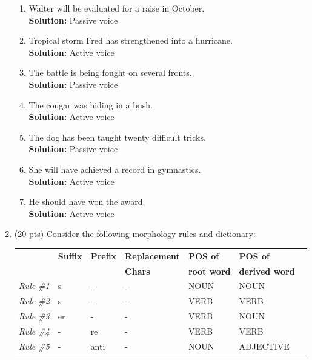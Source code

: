 \documentclass[11pt]{article}
\begin{document}
\begin{enumerate}
\begin{enumerate}
\item Walter will be evaluated for a raise in October.  \\
\textbf{Solution:} Passive voice\\

\item Tropical storm Fred has strengthened into a hurricane. \\
\textbf{Solution:} Active voice\\

\item The battle is being fought on several fronts.  \\
\textbf{Solution:} Passive voice\\

\item The cougar was hiding in a bush. \\
\textbf{Solution:} Active voice\\

\item The dog has been taught twenty difficult tricks.  \\
\textbf{Solution:} Passive voice\\

\item She will have achieved a record in gymnastics. \\
\textbf{Solution:} Active voice\\

\item He should have won the award.  \\
\textbf{Solution:} Active voice\\

\end{enumerate}


\newpage
\item (20 pts) Consider the following morphology rules and dictionary:

\begin{center}
\begin{tabular}{|l|l|l|l|l|l|l|} \hline
~ & \textbf{Suffix} & \textbf{Prefix} & \textbf{Replacement} & \textbf{POS of} & \textbf{POS of } \\
~ & ~ & ~ & \textbf{Chars} & \textbf{root word} & \textbf{derived word} \\ \hline
{\it Rule \#1} & s & - & - & NOUN & NOUN \\
{\it Rule \#2} &s & - & - & VERB & VERB \\
{\it Rule \#3} &er & - & - & VERB & NOUN \\
{\it Rule \#4} &- & re & - & VERB & VERB \\
{\it Rule \#5} &- & anti & - & NOUN & ADJECTIVE \\ \hline
\end{tabular}
\end{center}


\end{enumerate}
\end{document}
